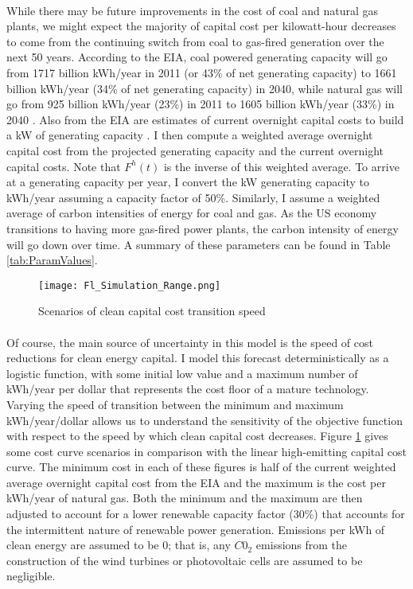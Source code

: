 \documentclass[singlespace]{easychithesis}
\begin{document}
\paragraph{} While there may be future improvements in the cost of coal and natural gas plants, we might expect the majority of capital cost per kilowatt-hour decreases to come from the continuing switch from coal to gas-fired generation over the next 50 years. According to the EIA, coal powered generating capacity will go from 1717 billion kWh/year in 2011 (or 43\% of net generating capacity) to 1661 billion kWh/year (34\% of net generating capacity) in 2040, while natural gas will go from 925 billion kWh/year (23\%) in 2011 to 1605 billion kWh/year (33\%) in 2040 \cite{EIATable5}. Also from the EIA are estimates of current overnight capital costs to build a kW of generating capacity \cite{EIACapCost}. I then compute a weighted average overnight capital cost from the projected generating capacity and the current overnight capital costs. Note that $F^h(t)$ is the inverse of this weighted average. To arrive at a generating capacity per year, I convert the kW generating capacity to kWh/year assuming a capacity factor of 50\%. Similarly, I assume a weighted average of carbon intensities of energy for coal and gas. As the US economy transitions to having more gas-fired power plants, the carbon intensity of energy will go down over time. A summary of these parameters can be found in Table \ref{tab:ParamValues}. 

\begin{figure}[h]\label{fig:FlScaleScenarios}
\texttt{[image: Fl\_Simulation\_Range.png]}
\caption{Scenarios of clean capital cost transition speed}
\end{figure}

\paragraph{} Of course, the main source of uncertainty in this model is the speed of cost reductions for clean energy capital. I model this forecast deterministically as a logistic function, with some initial low value and a maximum number of kWh/year per dollar that represents the cost floor of a mature technology. Varying the speed of transition between the minimum and maximum kWh/year/dollar allows us to understand the sensitivity of the objective function with respect to the speed by which clean capital cost decreases. Figure \ref{fig:FlScaleScenarios} gives some cost curve scenarios in comparison with the linear high-emitting capital cost curve. The minimum cost in each of these figures is half of the current weighted average overnight capital cost from the EIA and the maximum is the cost per kWh/year of natural gas. Both the minimum and the maximum are then adjusted to account for a lower renewable capacity factor (30\%) that accounts for the intermittent nature of renewable power generation. Emissions per kWh of clean energy are assumed to be 0; that is, any $C0_2$ emissions from the construction of the wind turbines or photovoltaic cells are assumed to be negligible. 
\end{document}
